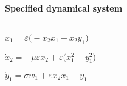 
\begin{math}
\end{math}
\paragraph{Specified dynamical system}
\begin{math}
\end{math}\par

\begin{math}
\dot x_{1}=\varepsilon  \big(-x_{2} x_{1}-x_{2} y_{1}\big)
\end{math}\par

\begin{math}
\dot x_{2}=-\mu  \varepsilon  x_{2}+\varepsilon  \big(x_{1}^{2}-y_{1}^{2
}\big)
\end{math}\par

\begin{math}
\dot y_{1}=\sigma  w_{1}+\varepsilon  x_{2} x_{1}-y_{1}
\end{math}\par
